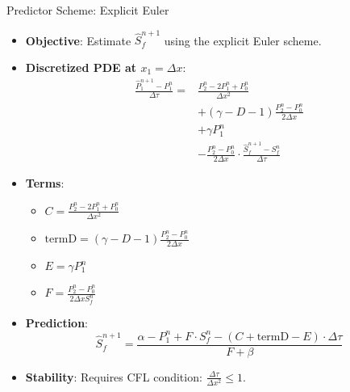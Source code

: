 \documentclass{beamer}
\begin{document}
\begin{frame}{Predictor Scheme: Explicit Euler}
    \begin{itemize}
        \item \textbf{Objective}: Estimate \( \hat{S}_f^{n+1} \) using the explicit Euler scheme.
        \item \textbf{Discretized PDE at \( x_1 = \Delta x \)}:
        \[
        \begin{aligned}
        \frac{\hat{P}_1^{n+1} - P_1^n}{\Delta \tau} = & \frac{P_2^n - 2 P_1^n + P_0^n}{\Delta x^2} \\
        & + (\gamma - D - 1) \frac{P_2^n - P_0^n}{2 \Delta x} \\
        & + \gamma P_1^n \\
        & - \frac{P_2^n - P_0^n}{2 \Delta x} \cdot \frac{\hat{S}_f^{n+1} - S_f^n}{\Delta \tau}
        \end{aligned}
        \]
        \item \textbf{Terms}:
        \begin{itemize}
            \item \( C = \frac{P_2^n - 2 P_1^n + P_0^n}{\Delta x^2} \)
            \item \( \text{termD} = (\gamma - D - 1) \frac{P_2^n - P_0^n}{2 \Delta x} \)
            \item \( E = \gamma P_1^n \)
            \item \( F = \frac{P_2^n - P_0^n}{2 \Delta x S_f^n} \)
        \end{itemize}
        \item \textbf{Prediction}:
        \[
        \hat{S}_f^{n+1} = \frac{\alpha - P_1^n + F \cdot S_f^n - (C + \text{termD} - E) \cdot \Delta \tau}{F + \beta}
        \]
        \item \textbf{Stability}: Requires CFL condition: \( \frac{\Delta \tau}{\Delta x^2} \leq 1 \).
    \end{itemize}
\end{frame}
\end{document}
